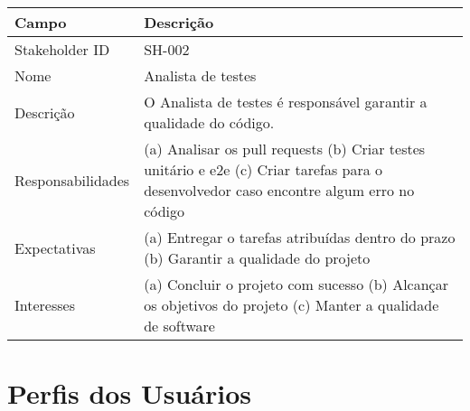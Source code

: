 \begin{table}[htbp]
\begin{tabularx}{\textwidth}{| l | X |}
\hline
Campo             & Descrição                                                                                                                                                                           \\ \hline
Stakeholder ID    & SH-002                                                                                                                                                                              \\ \hline
Nome              & Analista de testes                                                                                                                                                                       \\ \hline
Descrição         & O Analista de testes é responsável garantir a qualidade do código.                                                                                                  \\ \hline
Responsabilidades & (a) Analisar os pull requests (b) Criar testes unitário e e2e (c) Criar tarefas para o desenvolvedor caso encontre algum erro no código \\ \hline
Expectativas      & (a) Entregar o tarefas atribuídas dentro do prazo (b) Garantir a qualidade do projeto                                                                                   \\ \hline
Interesses        & (a) Concluir o projeto com sucesso (b) Alcançar os objetivos do projeto (c) Manter a qualidade de software                                                                           \\ \hline

\end{tabularx}
\end{table}   

\section{Perfis dos Usuários}

